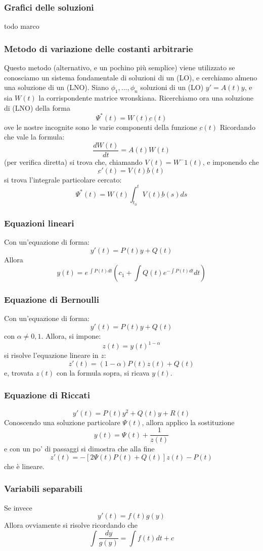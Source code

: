 \documentclass[a4paper,12pt]{article}
\begin{document}
\subsubsection{Grafici delle soluzioni}
todo marco

\subsubsection{Metodo di variazione delle costanti arbitrarie}
Questo metodo (alternativo, e un pochino più semplice) viene utilizzato se conosciamo un sistema fondamentale di soluzioni di un (LO), e cerchiamo almeno una soluzione di un (LNO).
Siano $\phi_1,...,\phi_n$ soluzioni di un (LO) $y'= A(t)y$, e sia $W(t)$ la corrispondente matrice wronskiana.
Ricerchiamo ora una soluzione di (LNO) della forma
$$\Psi^*(t)=W(t)\underbar{c}(t)$$
ove le nostre incognite sono le varie componenti della funzione $\underbar{c}(t)$
Ricordando che vale la formula:
$$\frac{dW(t)}{dt} = A(t)W(t)$$
(per verifica diretta) si trova che, chiamando $V(t) = W^-1(t)$, e imponendo che $$\underbar{c}'(t) = V(t)\underbar{b}(t)$$
si trova l'integrale particolare cercato:
$$\Psi^*(t)= W(t)\int_{t_0}^t V(t)\underbar{b}(s) ds$$

\subsubsection{Equazioni lineari}
Con un'equazione di forma:
$$y'(t) = P(t)y+Q(t)$$
Allora
$$y(t)=e^{\ \displaystyle\int P(t)dt}\left(c_1 + \int Q(t)e^{-\displaystyle\int P(t)dt}dt\right)$$
\subsubsection{Equazione di Bernoulli}
Con un'equazione di forma:
$$y'(t) = P(t)y+Q(t)$$
con $\alpha \neq 0, 1$. Allora, si impone:
$$ z(t)=y(t)^{1-\alpha} $$
si risolve l'equazione lineare in $z$: $$z'(t)=(1-\alpha)P(t)z(t)+Q(t)$$ e, trovata $z(t)$ con la formula sopra, si ricava $y(t)$.

\subsubsection{Equazione di Riccati}
$$y'(t) = P(t)y^2+Q(t)y+R(t)$$
Conoscendo una soluzione particolare $\Psi(t)$, allora applico la sostituzione
$$y(t)=\Psi(t)+\dfrac{1}{z(t)}$$
e con un po' di passaggi si dimostra che alla fine
$$z'(t)= -\left[2\Psi(t)P(t)+Q(t)\right]z(t)-P(t)$$
che è lineare.
\subsubsection{Variabili separabili}
Se invece
$$y'(t) = f(t)g(y)$$
Allora ovviamente si risolve ricordando che
$$\int\dfrac{dy}{g(y)}=\int f(t)dt + c$$
\end{document}
